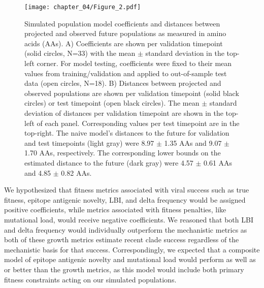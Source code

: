 \begin{figure}
  \begin{center}
  \texttt{[image: chapter\_04/Figure\_2.pdf]}
  \caption{
    Simulated population model coefficients and distances between projected and observed future populations as measured in amino acids (AAs).
    A) Coefficients are shown per validation timepoint (solid circles, N=33) with the mean $\pm$ standard deviation in the top-left corner.
    For model testing, coefficients were fixed to their mean values from training/validation and applied to out-of-sample test data (open circles, N=18).
    B) Distances between projected and observed populations are shown per validation timepoint (solid black circles) or test timepoint (open black circles).
    The mean $\pm$ standard deviation of distances per validation timepoint are shown in the top-left of each panel.
    Corresponding values per test timepoint are in the top-right.
    The naive model's distances to the future for validation and test timepoints (light gray) were 8.97 $\pm$ 1.35 AAs and 9.07 $\pm$ 1.70 AAs, respectively.
    The corresponding lower bounds on the estimated distance to the future (dark gray) were 4.57 $\pm$ 0.61 AAs and 4.85 $\pm$ 0.82 AAs.
  }
  \label{fig:unadjusted_model_accuracy_and_coefficients_for_simulated_populations_controls}
  \end{center}
\end{figure}

We hypothesized that fitness metrics associated with viral success such as true fitness, epitope antigenic novelty, LBI, and delta frequency would be assigned positive coefficients, while metrics associated with fitness penalties, like mutational load, would receive negative coefficients.
We reasoned that both LBI and delta frequency would individually outperform the mechanistic metrics as both of these growth metrics estimate recent clade success regardless of the mechanistic basis for that success.
Correspondingly, we expected that a composite model of epitope antigenic novelty and mutational load would perform as well as or better than the growth metrics, as this model would include both primary fitness constraints acting on our simulated populations.

